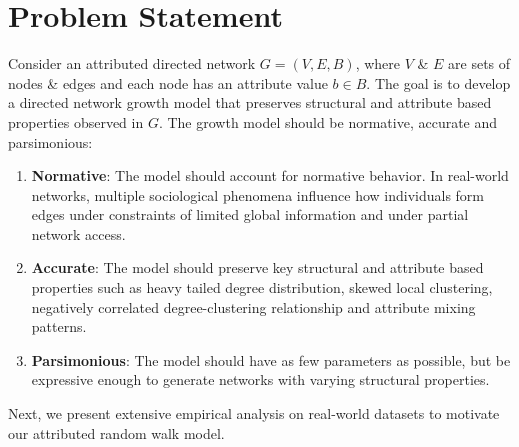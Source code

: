 \section{Problem Statement}
\label{sec:Problem Statement}

Consider an attributed directed network $G=(V,E,B)$, where $V$ \& $E$ are
sets of nodes \& edges and each node has an attribute value $b \in B$.
The goal is to develop a directed network growth model that preserves structural
and attribute based properties observed in $G$. The growth model should be
normative, accurate and parsimonious:
\begin{enumerate}
    \item \textbf{Normative}: The model should account for normative behavior. In real-world
    networks, multiple sociological phenomena influence how individuals form edges under
    constraints of limited global information and under partial network access.
    \item \textbf{Accurate}: The model should preserve key structural
    and attribute based properties such as heavy tailed degree distribution, skewed
    local clustering, negatively correlated degree-clustering relationship
    and attribute mixing patterns.
    \item \textbf{Parsimonious}: The model should have as few parameters as possible, but be expressive enough to generate networks with varying structural properties.
\end{enumerate}

Next, we present extensive empirical analysis on real-world datasets to motivate our attributed random walk model.

